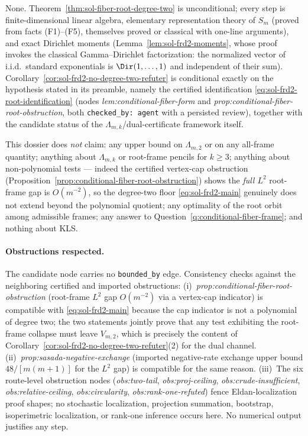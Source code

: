 \documentclass[../main.tex]{subfiles}
\begin{document}
\begin{remark}
\label{rem:sol-frd2-unclosed}
None.  Theorem~\ref{thm:sol-fiber-root-degree-two} is unconditional; every step is
finite-dimensional linear algebra, elementary representation theory of $S_m$
(proved from facts (F1)--(F5), themselves proved or classical with one-line
arguments), and exact Dirichlet moments
(Lemma~\ref{lem:sol-frd2-moments}, whose proof invokes the classical
Gamma--Dirichlet factorization: the normalized vector of i.i.d.\ standard
exponentials is $\Dir(1,\dots,1)$ and independent of their sum).
Corollary~\ref{cor:sol-frd2-no-degree-two-refuter} is conditional exactly on the
hypothesis stated in its preamble, namely the certified identification
\eqref{eq:sol-frd2-root-identification} (nodes \emph{lem:conditional-fiber-form}
and \emph{prop:conditional-fiber-root-obstruction}, both \texttt{checked\_by:
agent} with a persisted review), together with the candidate status of the
$\Lambda_{m,k}$/dual-certificate framework itself.
\end{remark}

\begin{remark}
\label{rem:sol-frd2-nonclaims}
This dossier does \emph{not} claim: any upper bound on $\Lambda_{m,2}$ or on any
all-frame quantity; anything about $\Lambda_{m,k}$ or root-frame pencils for
$k\ge3$; anything about non-polynomial tests --- indeed the certified vertex-cap
obstruction (Proposition~\ref{prop:conditional-fiber-root-obstruction}) shows the
\emph{full $L^2$} root-frame gap is $O(m^{-2})$, so the degree-two floor
\eqref{eq:sol-frd2-main} genuinely does not extend beyond the polynomial quotient;
any optimality of the root orbit among admissible frames; any answer to
Question~\ref{q:conditional-fiber-frame}; and nothing about KLS.
\end{remark}

\paragraph{Obstructions respected.}
The candidate node carries no \texttt{bounded\_by} edge.  Consistency checks
against the neighboring certified and imported obstructions:
(i)~\emph{prop:conditional-fiber-root-obstruction} (root-frame $L^2$ gap
$O(m^{-2})$ via a vertex-cap indicator) is compatible with
\eqref{eq:sol-frd2-main} because the cap indicator is not a polynomial of degree
two; the two statements jointly prove that any test exhibiting the root-frame
collapse must leave $V_{m,2}$, which is precisely the content of
Corollary~\ref{cor:sol-frd2-no-degree-two-refuter}(2) for the dual channel.
(ii)~\emph{prop:sasada-negative-exchange} (imported negative-rate exchange upper
bound $48/[m(m+1)]$ for the $L^2$ gap) is compatible for the same reason.
(iii)~The six route-level obstruction nodes (\emph{obs:two-tail},
\emph{obs:proj-ceiling}, \emph{obs:crude-insufficient},
\emph{obs:relative-ceiling}, \emph{obs:circularity},
\emph{obs:rank-one-refuted}) fence Eldan-localization proof shapes; no stochastic
localization, projection summation, bootstrap, isoperimetric localization, or
rank-one inference occurs here.  No numerical output justifies any step.

\end{document}
